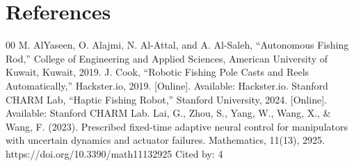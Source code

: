 \documentclass[conference]{IEEEtran}
\begin{document}
\section*{References}

\begin{thebibliography}{00}
 M. AlYaseen, O. Alajmi, N. Al-Attal, and A. Al-Saleh, “Autonomous Fishing Rod,” College of Engineering and Applied Sciences, American University of Kuwait, Kuwait, 2019.
 J. Cook, “Robotic Fishing Pole Casts and Reels Automatically,” Hackster.io, 2019. [Online]. Available: Hackster.io.
 Stanford CHARM Lab, “Haptic Fishing Robot,” Stanford University, 2024. [Online]. Available: Stanford CHARM Lab.
 Lai, G., Zhou, S., Yang, W., Wang, X., \& Wang, F. (2023). Prescribed fixed-time adaptive neural control for manipulators with uncertain dynamics and actuator failures. Mathematics, 11(13), 2925. https://doi.org/10.3390/math11132925 Cited by: 4
\end{thebibliography}
\end{document}

